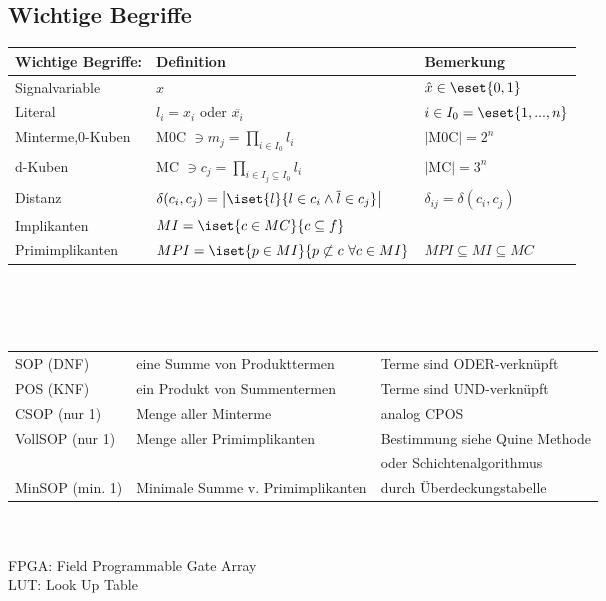 \documentclass[6pt,a4paper]{scrartcl}
\begin{document}
\begin{multicols}{3}
	\subsection{Wichtige Begriffe}
	\begin{tabular}{l|l|l}
		Wichtige Begriffe: & Definition & Bemerkung\\ \hline
		Signalvariable & $x$ & $\hat x \in \eset{0,1}$ \\
		Literal & $l_i = x_i$ oder $\overline{x_i}$ & $i \in I_0=\eset{1,...,n}$\\
		Minterme,0-Kuben & M0C $\ni m_j = \prod\limits_{i\in I_0} l_i$ & $|$M0C$| = 2^n$ \\
		d-Kuben & MC $\ni c_j = \prod\limits_{i\in I_j \subseteq I_0} l_i$ & $|$MC$|=3^n$\\
		Distanz & $\delta(c_i,c_j) = \bigl| \iset{l}{l \in c_i \land \overline{l}\in c_j}  \bigr|$ & $\delta_{ij} = \delta(c_i,c_j)$ \\
		Implikanten & $MI = \iset{c \in MC}{c \subseteq f}$ &  \\
		Primimplikanten & $MPI = \iset{p \in MI}{p \not\subset c \ \forall c \in MI}$ & $MPI \subseteq MI \subseteq MC$\\
	\end{tabular}\\ \\ \\
	\begin{tabular}{l|l|l}	
		SOP (DNF) & eine Summe von Produkttermen & Terme sind ODER-verknüpft \\
		POS (KNF) & ein Produkt von Summentermen & Terme sind UND-verknüpft\\
		CSOP (nur 1)& Menge aller Minterme & analog CPOS \\
		VollSOP (nur 1)& Menge aller Primimplikanten & Bestimmung siehe Quine Methode\\
		& & oder Schichtenalgorithmus\\
		MinSOP (min. 1)& Minimale Summe v. Primimplikanten & durch Überdeckungstabelle \\
	\end{tabular}
	\\ \\
	FPGA: Field Programmable Gate Array\\
	LUT: Look Up Table\\



\end{multicols}
\end{document}

